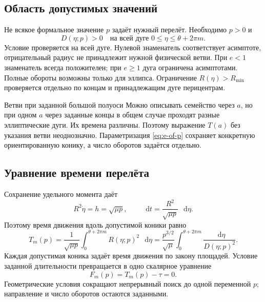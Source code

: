 \documentclass[a4paper,11pt]{article}
\newcommand{\dd}{\mathop{}\!\mathrm d}
\numberwithin{equation}{section}
\theoremstyle{remark}
\begin{document}
\subsection{Область допустимых значений}

Не всякое формальное значение $p$ задаёт нужный перелёт.
Необходимо $p>0$ и
\begin{equation}
 D(\eta;p)>0\quad
 \text{на всей дуге }0\le\eta\le\theta+2\pi m.
 \label{eq:admissible-arc}
\end{equation}
Условие проверяется на всей дуге. Нулевой знаменатель
соответствует асимптоте, отрицательный радиус не принадлежит
нужной физической ветви. При $e<1$ знаменатель всегда положителен;
при $e\ge1$ дуга ограничена асимптотами.
Полные обороты возможны только для эллипса.
Ограничение $R(\eta)>R_{\min}$ проверяется отдельно
по концам и принадлежащим дуге перицентрам.

\begin{explanation}{Ветви при заданной большой полуоси}
Можно описывать семейство через $a$, но при одном $a$
через заданные концы в общем случае проходят разные
эллиптические дуги. Их времена различны.
Поэтому выражение $T(a)$ без указания ветви неоднозначно.
Параметризация \eqref{eq:e-of-p} сохраняет конкретную
ориентированную конику, а число оборотов задаётся отдельно.
\end{explanation}

\subsection{Уравнение времени перелёта}

Сохранение удельного момента даёт
\[
 R^2\dot\eta=h=\sqrt{\mu p},\qquad
 \dd t=\frac{R^2}{\sqrt{\mu p}}\,\dd\eta.
\]
Поэтому время движения вдоль допустимой коники равно
\begin{equation}
 T_m(p)=\frac1{\sqrt{\mu p}}
  \int_0^{\theta+2\pi m}R(\eta;p)^2\,\dd\eta
 =\frac{p^{3/2}}{\sqrt\mu}
  \int_0^{\theta+2\pi m}\frac{\dd\eta}{D(\eta;p)^2}.
 \label{eq:lambert-time-integral}
\end{equation}
Каждая допустимая коника задаёт время движения по закону площадей.
Условие заданной длительности превращается в одно скалярное
уравнение
\begin{equation}
 F_m(p)=T_m(p)-\tau=0.
 \label{eq:lambert-scalar}
\end{equation}
Геометрические условия сокращают непрерывный поиск до одной
переменной $p$; направление и число оборотов остаются заданными.
\end{document}
